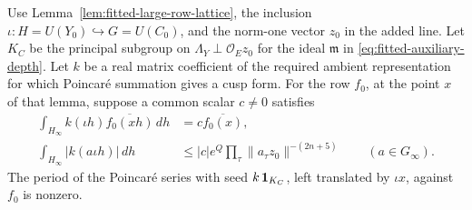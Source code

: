 \begin{auxlemma}\label{lem:fitted-prescribed-tail}
Use Lemma~\ref{lem:fitted-large-row-lattice}, the inclusion
\(\iota:H=U(Y_0)\hookrightarrow G=U(C_0)\), and the norm-one vector
\(z_0\) in the added line. Let \(K_C\) be the principal subgroup on
\(\Lambda_Y\perp\mathcal O_E z_0\) for the ideal \(\mathfrak m\) in
\eqref{eq:fitted-auxiliary-depth}. Let \(k\) be a real matrix
coefficient of the required ambient representation for which
Poincar\'e summation gives a cusp form. For the row \(f_0\), at the
point \(x\) of that lemma, suppose a common scalar \(c\ne0\) satisfies
\[
 \begin{aligned}
 \int_{H_\infty}k(\iota h)\overline{f_0(xh)}\,dh
  &=c\overline{f_0(x)},\\
 \int_{H_\infty}|k(a\iota h)|\,dh
  &\le |c|e^Q\prod_\tau\|a_\tau z_0\|^{-(2n+5)}
      \qquad(a\in G_\infty).
 \end{aligned}
\]
The period of the Poincar\'e series with seed \(k\,{\bf1}_{K_C}\),
left translated by \(\iota x\), against \(f_0\) is nonzero.
\end{auxlemma}

